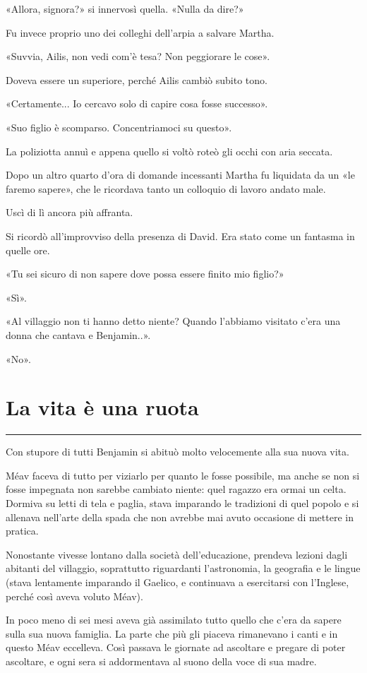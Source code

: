 \documentclass[a4paper,11pt,oneside,openright,final]{memoir}
\begin{document}
«Allora, signora?» si innervosì quella. «Nulla da dire?»

Fu invece proprio uno dei colleghi dell'arpia a salvare Martha.

«Suvvia, Ailis, non vedi com'è tesa? Non peggiorare le cose».

Doveva essere un superiore, perché Ailis cambiò subito tono.

«Certamente... Io cercavo solo di capire cosa fosse successo».

«Suo figlio è scomparso. Concentriamoci su questo».

La poliziotta annuì e appena quello si voltò roteò gli occhi con aria
seccata.

Dopo un altro quarto d'ora di domande incessanti Martha fu liquidata da un «le
faremo sapere», che le ricordava tanto un colloquio di lavoro andato male.

Uscì di lì ancora più affranta.

Si ricordò all'improvviso della presenza di David. Era stato come un fantasma
in quelle ore.

«Tu sei sicuro di non sapere dove possa essere finito mio figlio?»

«Sì».

«Al villaggio non ti hanno detto niente? Quando l'abbiamo visitato c'era una
donna che cantava e Benjamin..».

«No».

\chapter{La vita è una ruota}

\plainbreak{1}

Con stupore di tutti Benjamin si abituò molto velocemente alla sua nuova vita.

Méav faceva di tutto per viziarlo per quanto le fosse possibile, ma anche se
non si fosse impegnata non sarebbe cambiato niente: quel ragazzo era ormai un
celta. Dormiva su letti di tela e paglia, stava imparando le tradizioni di quel
popolo e si allenava nell'arte della spada che non avrebbe mai avuto occasione
di mettere in pratica.

Nonostante vivesse lontano dalla società dell'educazione, prendeva lezioni
dagli abitanti del villaggio, soprattutto riguardanti l'astronomia, la geografia
e le lingue (stava lentamente imparando il Gaelico, e continuava a esercitarsi
con l'Inglese, perché così aveva voluto Méav).

In poco meno di sei mesi aveva già assimilato tutto quello che c'era da sapere
sulla sua nuova famiglia. La parte che più gli piaceva rimanevano i canti e in
questo Méav eccelleva. Così passava le giornate ad ascoltare e pregare di
poter ascoltare, e ogni sera si addormentava al suono della voce di sua madre.
\end{document}
